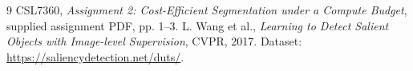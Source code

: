 \documentclass[11pt,a4paper]{article}
\begin{document}
\begin{thebibliography}{9}
\small
\setlength{\itemsep}{0pt}
 CSL7360, \emph{Assignment 2: Cost-Efficient Segmentation under a Compute Budget}, supplied assignment PDF, pp. 1--3.
 L. Wang et al., \emph{Learning to Detect Salient Objects with Image-level Supervision}, CVPR, 2017. Dataset: \url{https://saliencydetection.net/duts/}.
\end{thebibliography}
\end{document}
